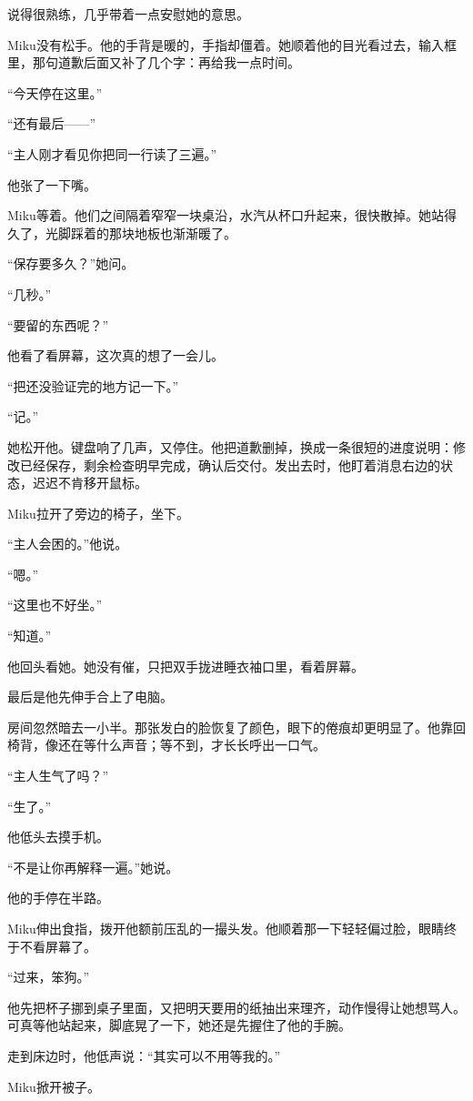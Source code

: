 说得很熟练，几乎带着一点安慰她的意思。

Miku没有松手。他的手背是暖的，手指却僵着。她顺着他的目光看过去，输入框里，那句道歉后面又补了几个字：再给我一点时间。

“今天停在这里。”

“还有最后——”

“主人刚才看见你把同一行读了三遍。”

他张了一下嘴。

Miku等着。他们之间隔着窄窄一块桌沿，水汽从杯口升起来，很快散掉。她站得久了，光脚踩着的那块地板也渐渐暖了。

“保存要多久？”她问。

“几秒。”

“要留的东西呢？”

他看了看屏幕，这次真的想了一会儿。

“把还没验证完的地方记一下。”

“记。”

她松开他。键盘响了几声，又停住。他把道歉删掉，换成一条很短的进度说明：修改已经保存，剩余检查明早完成，确认后交付。发出去时，他盯着消息右边的状态，迟迟不肯移开鼠标。

Miku拉开了旁边的椅子，坐下。

“主人会困的。”他说。

“嗯。”

“这里也不好坐。”

“知道。”

他回头看她。她没有催，只把双手拢进睡衣袖口里，看着屏幕。

最后是他先伸手合上了电脑。

房间忽然暗去一小半。那张发白的脸恢复了颜色，眼下的倦痕却更明显了。他靠回椅背，像还在等什么声音；等不到，才长长呼出一口气。

“主人生气了吗？”

“生了。”

他低头去摸手机。

“不是让你再解释一遍。”她说。

他的手停在半路。

Miku伸出食指，拨开他额前压乱的一撮头发。他顺着那一下轻轻偏过脸，眼睛终于不看屏幕了。

“过来，笨狗。”

他先把杯子挪到桌子里面，又把明天要用的纸抽出来理齐，动作慢得让她想骂人。可真等他站起来，脚底晃了一下，她还是先握住了他的手腕。

走到床边时，他低声说：“其实可以不用等我的。”

Miku掀开被子。


